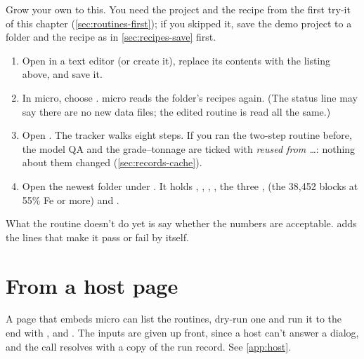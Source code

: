 \begin{tryit}
Grow your own  to this. You need the project and the recipe from the first try-it of this chapter (\cref{sec:routines-first}); if you skipped it, save the demo project to a folder and the recipe as in \cref{sec:recipes-save} first.
\begin{enumerate}
\item Open  in a text editor (or create it), replace its contents with the listing above, and save it.
\item In micro, choose . micro reads the folder's recipes again. (The status line may say there are no new data files; the edited routine is read all the same.)
\item Open . The tracker walks eight steps. If you ran the two-step routine before, the model QA and the grade–tonnage are ticked with \emph{reused from …}: nothing about them changed (\cref{sec:records-cache}).
\item Open the newest folder under . It holds , , , , the three ,  (the 38,452 blocks at 55\% Fe or more) and .
\end{enumerate}
\end{tryit}

What the routine doesn't do yet is say whether the numbers are acceptable.  adds the lines that make it pass or fail by itself.

\section{From a host page}
A page that embeds micro can list the routines, dry-run one and run it to the end with ,  and . The inputs are given up front, since a host can't answer a dialog, and the call resolves with a copy of the run record. See \cref{app:host}.
